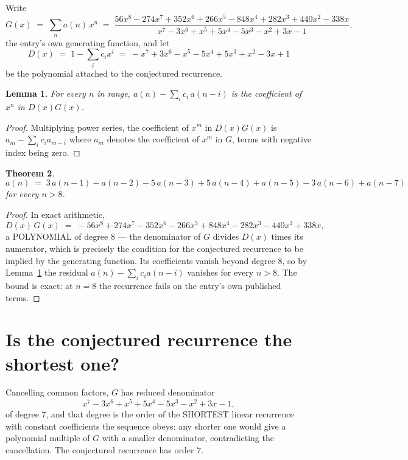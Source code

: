 \documentclass[11pt,a4paper]{article}
\theoremstyle{plain}
\newtheorem{theorem}{Theorem}
\newtheorem{lemma}[theorem]{Lemma}
\theoremstyle{definition}
\begin{document}
Write
\[
G(x)\;=\;\sum_{n}a(n)\,x^{n}\;=\;\frac{56 x^{8} - 274 x^{7} + 352 x^{6} + 266 x^{5} - 848 x^{4} + 282 x^{3} + 440 x^{2} - 338 x}{x^{7} - 3 x^{6} + x^{5} + 5 x^{4} - 5 x^{3} - x^{2} + 3 x - 1},
\]
the entry's own generating function, and let
\[
D(x)\;=\;1-\sum_i c_i x^{i}\;=\;- x^{7} + 3 x^{6} - x^{5} - 5 x^{4} + 5 x^{3} + x^{2} - 3 x + 1
\]
be the polynomial attached to the conjectured recurrence.

\begin{lemma}\label{lem:key}
For every $n$ in range, $a(n)-\sum_i c_i\,a(n-i)$ is the coefficient of $x^{n}$ in
$D(x)G(x)$.
\end{lemma}

\begin{proof}
Multiplying power series, the coefficient of $x^{m}$ in $D(x)G(x)$ is
$a_m-\sum_i c_i a_{m-i}$ where $a_m$ denotes the coefficient of $x^{m}$ in $G$, terms with
negative index being zero.
\end{proof}

\begin{theorem}
\[
a(n)\;=\;3\,a(n-1) - a(n-2) - 5\,a(n-3) + 5\,a(n-4) + a(n-5) - 3\,a(n-6) + a(n-7)
\]
for every $n>8$.
\end{theorem}

\begin{proof}
In exact arithmetic,
\[
D(x)\,G(x)\;=\;- 56 x^{8} + 274 x^{7} - 352 x^{6} - 266 x^{5} + 848 x^{4} - 282 x^{3} - 440 x^{2} + 338 x,
\]
a POLYNOMIAL of degree $8$ --- the denominator of $G$ divides $D(x)$ times its numerator,
which is precisely the condition for the conjectured recurrence to be implied by the
generating function. Its coefficients vanish beyond degree $8$, so by
Lemma~\ref{lem:key} the residual $a(n)-\sum_ic_ia(n-i)$ vanishes for every
$n>8$. The bound is exact: at $n=8$ the recurrence fails on the entry's own published terms.
\end{proof}

\section{Is the conjectured recurrence the shortest one?}

Cancelling common factors, $G$ has reduced denominator
\[
x^{7} - 3 x^{6} + x^{5} + 5 x^{4} - 5 x^{3} - x^{2} + 3 x - 1,
\]
of degree $7$, and that degree is the order of the SHORTEST linear recurrence with
constant coefficients the sequence obeys: any shorter one would give a polynomial multiple of
$G$ with a smaller denominator, contradicting the cancellation. The conjectured recurrence has
order $7$.
\end{document}
